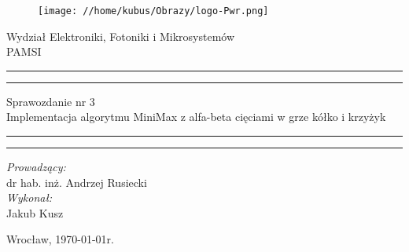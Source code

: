 \begin{titlepage}
\begin{figure}
	\centering
	\texttt{[image: //home/kubus/Obrazy/logo-Pwr.png]}
	
	\label{fig:pwr}
\end{figure}
	\begin{center}
		\huge Wydział Elektroniki, Fotoniki i Mikrosystemów \\ 
		\vspace{40pt}
		\huge PAMSI  \\
	\end{center}
	\vspace{60pt}
	\hrule
	\vspace{1pt}
	\hrule
	\begin{center}
		{\fontsize{40}{50}\selectfont Sprawozdanie nr 3\\ }
		\vspace{10pt}
		{\fontsize{25}{25}\selectfont Implementacja algorytmu MiniMax z alfa-beta cięciami w grze kółko i krzyżyk }
	\end{center}
	\hrule
	\vspace{1pt}
	\hrule
	\begin{flushright}
		\vspace{65pt}
		\textit{\Large Prowadzący:}\\
		
		\Large dr hab. inż. Andrzej Rusiecki\\
		\vspace{10pt}
		\textit{\Large Wykonał:}\\
		
		\Large Jakub Kusz \\
	
	\end{flushright}
	\vspace{90pt}
	\begin{center}
		\large Wrocław, \today r.
	\end{center}
\end{titlepage}

